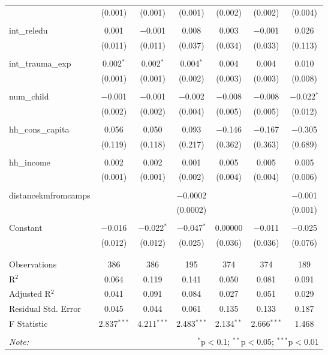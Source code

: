 \begin{table}[H]
\begin{tabular}{@{\extracolsep{4pt}}lcccccc}
  & (0.001) & (0.001) & (0.001) & (0.002) & (0.002) & (0.004) \\ 
  & & & & & & \\ 
 int\_reledu & 0.001 & $-$0.001 & 0.008 & 0.003 & $-$0.001 & 0.026 \\ 
  & (0.011) & (0.011) & (0.037) & (0.034) & (0.033) & (0.113) \\ 
  & & & & & & \\ 
 int\_trauma\_exp & 0.002$^{*}$ & 0.002$^{*}$ & 0.004$^{*}$ & 0.004 & 0.004 & 0.010 \\ 
  & (0.001) & (0.001) & (0.002) & (0.003) & (0.003) & (0.008) \\ 
  & & & & & & \\ 
 num\_child & $-$0.001 & $-$0.001 & $-$0.002 & $-$0.008 & $-$0.008 & $-$0.022$^{*}$ \\ 
  & (0.002) & (0.002) & (0.004) & (0.005) & (0.005) & (0.012) \\ 
  & & & & & & \\ 
 hh\_cons\_capita & 0.056 & 0.050 & 0.093 & $-$0.146 & $-$0.167 & $-$0.305 \\ 
  & (0.119) & (0.118) & (0.217) & (0.362) & (0.363) & (0.689) \\ 
  & & & & & & \\ 
 hh\_income & 0.002 & 0.002 & 0.001 & 0.005 & 0.005 & 0.005 \\ 
  & (0.001) & (0.001) & (0.002) & (0.004) & (0.004) & (0.006) \\ 
  & & & & & & \\ 
 distancekmfromcamps &  &  & $-$0.0002 &  &  & $-$0.001 \\ 
  &  &  & (0.0002) &  &  & (0.001) \\ 
  & & & & & & \\ 
 Constant & $-$0.016 & $-$0.022$^{*}$ & $-$0.047$^{*}$ & 0.00000 & $-$0.011 & $-$0.025 \\ 
  & (0.012) & (0.012) & (0.025) & (0.036) & (0.036) & (0.076) \\ 
  & & & & & & \\ 
\hline \\[-1.8ex] 
Observations & 386 & 386 & 195 & 374 & 374 & 189 \\ 
R$^{2}$ & 0.064 & 0.119 & 0.141 & 0.050 & 0.081 & 0.091 \\ 
Adjusted R$^{2}$ & 0.041 & 0.091 & 0.084 & 0.027 & 0.051 & 0.029 \\ 
Residual Std. Error & 0.045 & 0.044 & 0.061 & 0.135 & 0.133 & 0.187 \\ 
F Statistic & 2.837$^{***}$ & 4.211$^{***}$ & 2.483$^{***}$ & 2.134$^{**}$ & 2.666$^{***}$ & 1.468 \\ 
\hline 
\hline \\[-1.8ex] 
\textit{Note:}  & \multicolumn{6}{r}{$^{*}$p$<$0.1; $^{**}$p$<$0.05; $^{***}$p$<$0.01} \\ 
\end{tabular} 
\end{table} 
